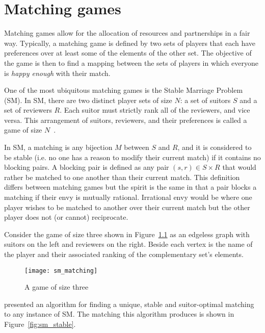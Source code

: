 \chapter{Matching games}
\label{chp:matching}

\graphicspath{{chapters/matching/paper/img/}}

Matching games allow for the allocation of resources and partnerships in a fair
way. Typically, a matching game is defined by two sets of players that each have
preferences over at least some of the elements of the other set. The objective
of the game is then to find a mapping between the sets of players in which
everyone is \emph{happy enough} with their match.

One of the most ubiquitous matching games is the Stable Marriage Problem
(SM). In SM, there are two distinct player sets of size \(N\): a set of suitors
\(S\) and a set of reviewers \(R\). Each suitor must strictly rank all of the
reviewers, and vice versa. This arrangement of suitors, reviewers, and
their preferences is called a game of size \(N\)~\cite{Gale1962}.

In SM, a matching is any bijection \(M\) between \(S\) and \(R\), and it is
considered to be stable (i.e. no one has a reason to modify their current match)
if it contains no blocking pairs. A blocking pair is defined as any pair \((s,
r) \in S \times R\) that would rather be matched to one another than their
current match. This definition differs between matching games but the spirit is
the same in that a pair blocks a matching if their envy is mutually rational.
Irrational envy would be where one player wishes to be matched to another over
their current match but the other player does not (or cannot) reciprocate.

Consider the game of size three shown in Figure~\ref{fig:sm_matching} as an
edgeless graph with suitors on the left and reviewers on the right. Beside each
vertex is the name of the player and their associated ranking of the
complementary set’s elements.

\begin{figure}
    \centering
    \texttt{[image: sm\_matching]}
    \caption{A game of size three}\label{fig:sm_matching}
\end{figure}


\cite{Gale1962} presented an algorithm for finding a unique, stable and
suitor-optimal matching to any instance of SM. The matching this algorithm
produces is shown in Figure~\ref{fig:sm_stable}.

